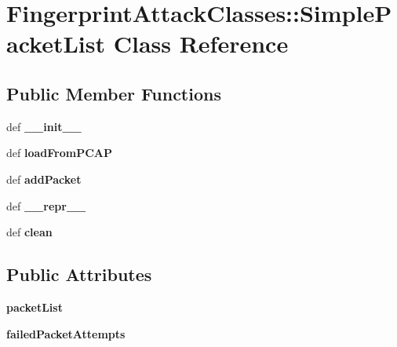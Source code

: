 \hypertarget{classFingerprintAttackClasses_1_1SimplePacketList}{
\section{FingerprintAttackClasses::SimplePacketList Class Reference}
\label{classFingerprintAttackClasses_1_1SimplePacketList}
}
\subsection*{Public Member Functions}
\begin{CompactItemize}
\item 
\hypertarget{classFingerprintAttackClasses_1_1SimplePacketList_8e7769bcb591256bef3142f12885235c}{
def \textbf{\_\-\_\-init\_\-\_\-}}
\label{classFingerprintAttackClasses_1_1SimplePacketList_8e7769bcb591256bef3142f12885235c}

\item 
\hypertarget{classFingerprintAttackClasses_1_1SimplePacketList_4e9a47f8affc3c4f0ad7586a11906b53}{
def \textbf{loadFromPCAP}}
\label{classFingerprintAttackClasses_1_1SimplePacketList_4e9a47f8affc3c4f0ad7586a11906b53}

\item 
\hypertarget{classFingerprintAttackClasses_1_1SimplePacketList_7ccf1f67421130c5dcdc45b3b12a9c74}{
def \textbf{addPacket}}
\label{classFingerprintAttackClasses_1_1SimplePacketList_7ccf1f67421130c5dcdc45b3b12a9c74}

\item 
\hypertarget{classFingerprintAttackClasses_1_1SimplePacketList_f7c907de60118804e68aa1d71ab986a1}{
def \textbf{\_\-\_\-repr\_\-\_\-}}
\label{classFingerprintAttackClasses_1_1SimplePacketList_f7c907de60118804e68aa1d71ab986a1}

\item 
\hypertarget{classFingerprintAttackClasses_1_1SimplePacketList_3012dce2170766407ea2276f34b5c84e}{
def \textbf{clean}}
\label{classFingerprintAttackClasses_1_1SimplePacketList_3012dce2170766407ea2276f34b5c84e}

\end{CompactItemize}
\subsection*{Public Attributes}
\begin{CompactItemize}
\item 
\hypertarget{classFingerprintAttackClasses_1_1SimplePacketList_38a589b36eaf466d8da714b0f35ec896}{
\textbf{packetList}}
\label{classFingerprintAttackClasses_1_1SimplePacketList_38a589b36eaf466d8da714b0f35ec896}

\item 
\hypertarget{classFingerprintAttackClasses_1_1SimplePacketList_76125723c61a0ebf4dd7fbdee0dcac74}{
\textbf{failedPacketAttempts}}
\label{classFingerprintAttackClasses_1_1SimplePacketList_76125723c61a0ebf4dd7fbdee0dcac74}

\end{CompactItemize}


